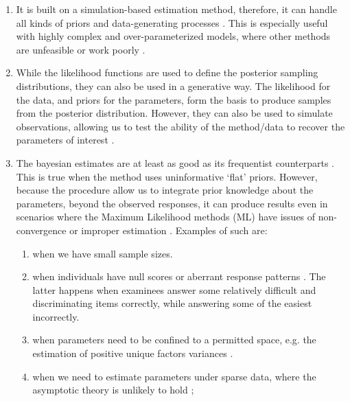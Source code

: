 \begin{enumerate}	
	\item It is built on a simulation-based estimation method, therefore, it can handle all kinds of priors and data-generating processes \cite{Fox_2010}. This is especially useful with highly complex and over-parameterized models, where other methods are unfeasible or work poorly \cite{Baker_1998, Kim_1999}. 
	
	\item While the likelihood functions are used to define the posterior sampling distributions, they can also be used in a generative way. The likelihood for the data, and priors for the parameters, form the basis to produce samples from the posterior distribution. However, they can also be used to simulate observations, allowing us to test the ability of the method/data to recover the parameters of interest \cite{McElreath_2020}.
	
	\item The bayesian estimates are at least as good as its frequentist counterparts \cite{Baker_1998, Wollack_2002, Hsieh_2010}. This is true when the method uses uninformative `flat' priors. However, because the procedure allow us to integrate prior knowledge about the parameters, beyond the observed responses, it can produce results even in scenarios where the Maximum Likelihood methods (ML) have issues of non-convergence or improper estimation \cite{Skrondal_et_al_2004a, Fox_2010, McElreath_2020}. Examples of such are: 
	
	\begin{enumerate}
		\item when we have small sample sizes.
		
		\item when individuals have null scores or aberrant response patterns \cite{Hambleton_et_al_1991a, Azevedo_2003}. The latter happens when examinees answer some relatively difficult and discriminating items correctly, while answering some of the easiest incorrectly.
		
		\item when parameters need to be confined to a permitted space, e.g. the estimation of positive unique factors variances \cite{Martin_et_al_1975}.
		
		\item when we need to estimate parameters under sparse data, where the asymptotic theory is unlikely to hold \cite{Fox_2010};
		
	\end{enumerate}
	
\end{enumerate}

